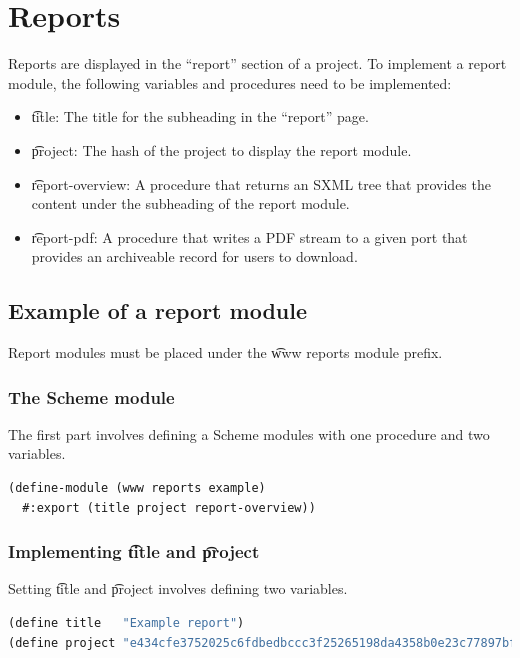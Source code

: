 \pagebreak{}
\section{Reports}
\label{sec:reports}

  Reports are displayed in the ``report'' section of a project.  To implement
  a report module, the following variables and procedures need to be implemented:
  \begin{itemize}
  \item \t{title}: The title for the subheading in the ``report'' page.
  \item \t{project}: The hash of the project to display the report module.
  \item \t{report-overview}: A procedure that returns an SXML tree that
    provides the content under the subheading of the report module.
  \item \t{report-pdf}: A procedure that writes a PDF stream to a given port
    that provides an archiveable record for users to download.
  \end{itemize}

\subsection{Example of a report module}

  Report modules must be placed under the \t{www reports} module prefix.

\subsubsection{The Scheme module}
\label{sec:scheme-module}

  The first part involves defining a Scheme modules with one procedure and
  two variables.

\begin{lstlisting}[language=Lisp]
(define-module (www reports example)
  #:export (title project report-overview))
\end{lstlisting}

\subsubsection{Implementing \t{title} and \t{project}}

  Setting \t{title} and \t{project} involves defining two variables.

\begin{lstlisting}[language=Lisp]
(define title   "Example report")
(define project "e434cfe3752025c6fdbedbccc3f25265198da4358b0e23c77897bf7f5844ba5c")
\end{lstlisting}

